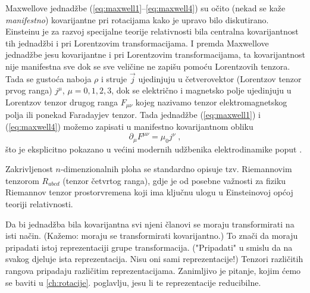 \begin{primjer}
 Maxwellove jednadžbe (\ref{eq:maxwell1}--\ref{eq:maxwell4}) su očito
 (nekad se kaže \emph{manifestno}) kovarijantne pri rotacijama kako
 je upravo bilo diskutirano. Einsteinu je za razvoj specijalne teorije relativnosti
 bila centralna kovarijantnost tih jednadžbi i pri Lorentzovim
 transformacijama. I premda Maxwellove jednadžbe jesu kovarijantne
 i pri Lorentzovim transformacijama, ta kovarijantnost
 nije manifestna sve dok se sve veličine ne
 zapišu pomoću Lorentzovih tenzora. Tada se gustoća naboja $\rho$ i
 struje $\vec{j}$ ujedinjuju u četverovektor (Lorentzov tenzor prvog
 ranga) $j^{\mu}$, $\mu=0, 1, 2, 3$, dok se električno i magnetsko
 polje ujedinjuju u Lorentzov tenzor drugog ranga
 $F_{\mu\nu}$ kojeg nazivamo tenzor elektromagnetskog polja ili
  ponekad Faradayjev tenzor. Tada jednadžbe (\ref{eq:maxwell1}) i (\ref{eq:maxwell4})
  možemo zapisati u manifestno kovarijantnom obliku
  \begin{equation}
      \partial_{\mu} F^{\mu\nu} = \mu_0 j^{\nu} \;,
      \label{eq:maxwell4D}
  \end{equation}
  što je eksplicitno pokazano u većini modernih udžbenika 
  elektrodinamike poput \cite{Zangwill:2012}.
\end{primjer}

\begin{primjer}
     
Zakrivljenost $n$-dimenzionalnih ploha se standardno opisuje
tzv. Riemannovim tenzorom $R_{abcd}$  (tenzor četvrtog ranga),
gdje je od posebne važnosti za fiziku Riemannov tenzor prostorvremena
koji ima ključnu ulogu u Einsteinovoj općoj teoriji relativnosti.
\end{primjer}


Da bi jednadžba bila kovarijantna svi njeni članovi se moraju transformirati
na isti način. (Kažemo: moraju se transformirati kovarijantno.)
To znači da moraju pripadati istoj reprezentaciji grupe transformacija.
("Pripadati" u smislu da na svakog djeluje ista reprezentacija. Nisu oni
sami reprezentacije!) Tenzori različitih rangova pripadaju različitim
reprezentacijama. Zanimljivo je pitanje, kojim ćemo se baviti
u \ref{ch:rotacije}. poglavlju, jesu li te reprezentacije reducibilne.
 
